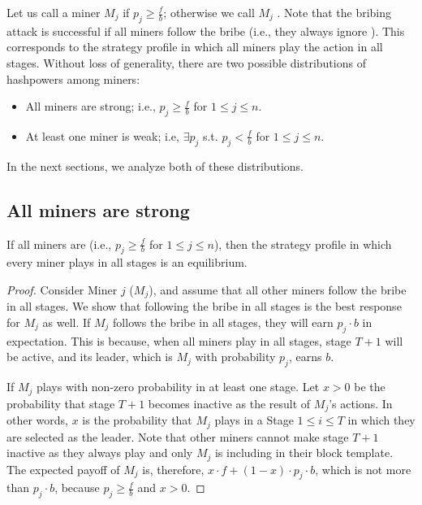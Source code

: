 Let us call a miner $M_j$ \strong{} if $p_j\geq \frac{f}{b}$; otherwise we call $M_j$ \weak{}. Note that the bribing attack is successful if all miners follow the bribe  (i.e., they always ignore \sellertxn{}). This corresponds to the strategy profile in which all miners play the action \follow{} in all stages. Without loss of generality, there are two possible distributions of hashpowers among miners:

\begin{itemize}
    \item All miners are strong; i.e., $p_j\geq \frac{f}{b}$ for $1\leq j\leq n$.
    \item At least one miner is weak; i.e, $\exists p_j$ s.t. $p_j < \frac{f}{b}$ for $1\leq j\leq n$.
\end{itemize}

In the next sections, we analyze both of these distributions.

\subsection{All miners are strong} \label{ss:all_miners_strong}

\begin{lemma}
\label{lem:strong}
  If all miners are \strong{} (i.e., $p_j\geq \frac{f}{b}$ for $1\leq j\leq n$), then the strategy profile in which every miner plays \follow{} in all stages is an equilibrium.
\end{lemma}
\begin{proof}
    Consider Miner $j$ ($M_j$), and assume that all other miners follow the bribe in all stages. We show that following the bribe in all stages is the best response for $M_j$ as well. If $M_j$ follows the bribe in all stages, they will earn $p_j\cdot b$ in expectation. This is because, when all miners play \follow{} in all stages, stage $T+1$ will be active, and its leader, which is $M_j$ with probability $p_j$, earns $b$. 
    
    If $M_j$ plays  with non-zero probability in at least one stage. Let $x>0$ be the probability that stage $T+1$ becomes inactive as the result of $M_j$'s actions. In other words, $x$ is the probability that $M_j$ plays  in a Stage $1\leq i \leq T$ in which they are selected as the leader. Note that other miners cannot make stage $T+1$ inactive as they always play \follow{} and only $M_j$ is including \sellertxn{} in their block template. The expected payoff of $M_j$ is, therefore, $x\cdot f+(1-x)\cdot p_j\cdot b$, which is not more than $p_j\cdot b$, because $p_j \geq \frac{f}{b}$ and $x>0$. 
\end{proof}

